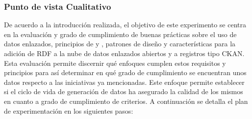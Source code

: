 \subsubsection{Punto de vista Cualitativo}
De acuerdo a la introducción realizada, el objetivo de este experimento se centra en la evaluación y grado 
de cumplimiento de buenas prácticas sobre el uso de datos enlazados, principios de \linkeddata y \opendata, 
patrones de diseño y características para la adición de \datasets \gls{RDF} a la nube de datos enlazados abiertos 
y a registros tipo \gls{CKAN}. Esta evaluación permite discernir qué enfoques cumplen estos requisitos y principios 
para así determinar en qué grado de cumplimiento se encuentran unos datos respecto a las iniciativas ya mencionadas. Este 
enfoque permite establecer si el ciclo de vida de generación de datos ha asegurado la calidad de los mismos 
en cuanto a grado de cumplimiento de criterios. A continuación se detalla el plan de experimentación en los 
siguientes pasos:


